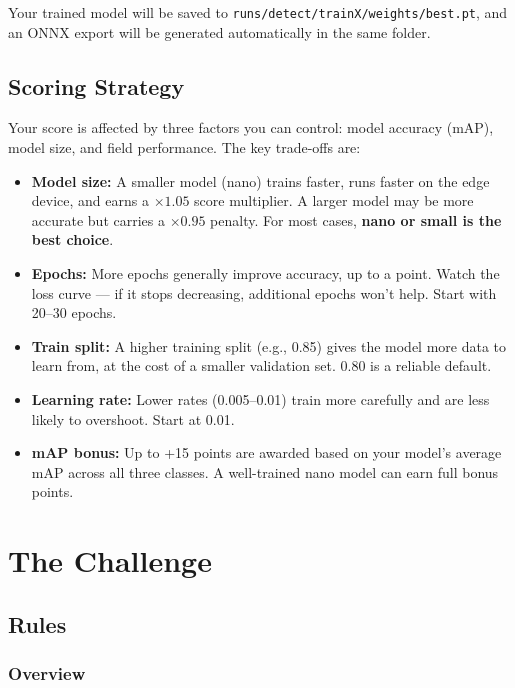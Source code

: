 \documentclass[11pt,a4paper]{article}
\begin{document}
Your trained model will be saved to \texttt{runs/detect/trainX/weights/best.pt}, and an ONNX export will be generated automatically in the same folder.

\subsection{Scoring Strategy}
\label{sec:scoring_strategy}

Your score is affected by three factors you can control: model accuracy (mAP), model size, and field performance. The key trade-offs are:

\begin{itemize}
    \item \textbf{Model size:} A smaller model (nano) trains faster, runs faster on the edge device, and earns a $\times 1.05$ score multiplier. A larger model may be more accurate but carries a $\times 0.95$ penalty. For most cases, \textbf{nano or small is the best choice}.
    \item \textbf{Epochs:} More epochs generally improve accuracy, up to a point. Watch the loss curve — if it stops decreasing, additional epochs won't help. Start with 20--30 epochs.
    \item \textbf{Train split:} A higher training split (e.g., 0.85) gives the model more data to learn from, at the cost of a smaller validation set. 0.80 is a reliable default.
    \item \textbf{Learning rate:} Lower rates (0.005--0.01) train more carefully and are less likely to overshoot. Start at 0.01.
    \item \textbf{mAP bonus:} Up to +15 points are awarded based on your model's average mAP across all three classes. A well-trained nano model can earn full bonus points.
\end{itemize}

\section{The Challenge}

\subsection{Rules}

\subsubsection*{Overview}
\end{document}
